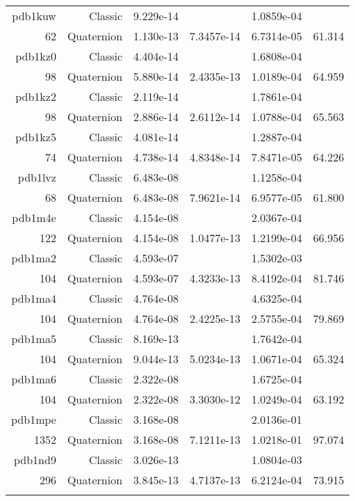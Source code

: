 \begin{xltabular}{\textwidth}{r|rS[table-format=1.3e+2]S[table-format=1.4e+2]S[table-format=1.4e+2]S[table-format=-1.3]}
pdb1kuw & Classic & 9.229e-14 &  & 1.0859e-04 & \\
62 & Quaternion & 1.130e-13 & 7.3457e-14 & 6.7314e-05 & 61.314\\  \addlinespace
pdb1kz0 & Classic & 4.404e-14 &  & 1.6808e-04 & \\
98 & Quaternion & 5.880e-14 & 2.4335e-13 & 1.0189e-04 & 64.959\\  \addlinespace
pdb1kz2 & Classic & 2.119e-14 &  & 1.7861e-04 & \\
98 & Quaternion & 2.886e-14 & 2.6112e-14 & 1.0788e-04 & 65.563\\  \addlinespace
pdb1kz5 & Classic & 4.081e-14 &  & 1.2887e-04 & \\
74 & Quaternion & 4.738e-14 & 4.8348e-14 & 7.8471e-05 & 64.226\\  \addlinespace
pdb1lvz & Classic & 6.483e-08 &  & 1.1258e-04 & \\
68 & Quaternion & 6.483e-08 & 7.9621e-14 & 6.9577e-05 & 61.800\\  \addlinespace
pdb1m4e & Classic & 4.154e-08 &  & 2.0367e-04 & \\
122 & Quaternion & 4.154e-08 & 1.0477e-13 & 1.2199e-04 & 66.956\\  \addlinespace
pdb1ma2 & Classic & 4.593e-07 &  & 1.5302e-03 & \\
104 & Quaternion & 4.593e-07 & 4.3233e-13 & 8.4192e-04 & 81.746\\  \addlinespace
pdb1ma4 & Classic & 4.764e-08 &  & 4.6325e-04 & \\
104 & Quaternion & 4.764e-08 & 2.4225e-13 & 2.5755e-04 & 79.869\\  \addlinespace
pdb1ma5 & Classic & 8.169e-13 &  & 1.7642e-04 & \\
104 & Quaternion & 9.044e-13 & 5.0234e-13 & 1.0671e-04 & 65.324\\  \addlinespace
pdb1ma6 & Classic & 2.322e-08 &  & 1.6725e-04 & \\
104 & Quaternion & 2.322e-08 & 3.3030e-12 & 1.0249e-04 & 63.192\\  \addlinespace
pdb1mpe & Classic & 3.168e-08 &  & 2.0136e-01 & \\
1352 & Quaternion & 3.168e-08 & 7.1211e-13 & 1.0218e-01 & 97.074\\  \addlinespace
pdb1nd9 & Classic & 3.026e-13 &  & 1.0804e-03 & \\
296 & Quaternion & 3.845e-13 & 4.7137e-13 & 6.2124e-04 & 73.915\\  \addlinespace

\end{xltabular}
